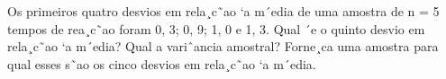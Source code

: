 \question Os primeiros quatro desvios em rela¸c˜ao `a m´edia de uma amostra de n = 5 tempos de
rea¸c˜ao foram 0, 3; 0, 9; 1, 0 e 1, 3. Qual ´e o quinto desvio em rela¸c˜ao `a m´edia? Qual a
variˆancia amostral? Forne¸ca uma amostra para qual esses s˜ao os cinco desvios em rela¸c˜ao
`a m´edia.